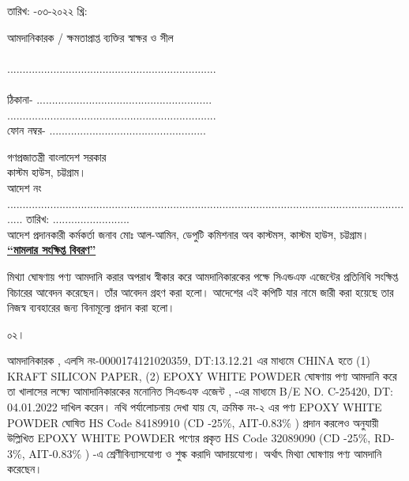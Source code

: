 \documentclass[12pt]{article}
\newcommand{\co}{CHINA}
\newcommand{\beno}{C-25420}
\newcommand{\bedt}{04.01.2022}
\newcommand{\lcno}{0000174121020359}
\newcommand{\lcdt}{13.12.21}
\newcommand{\impn}{\jeal}
\newcommand{\impadd}{\jeala}
\newcommand{\rodt}{\hspace{3em}-০৩-২০২২ খ্রি:}
\begin{document}
\begin{minipage}[t]{0.55\linewidth}
তারিখ: {\rodt}
\end{minipage}
\begin{minipage}[t]{0.45\linewidth}
আমদানিকারক / ক্ষমতাপ্রাপ্ত ব্যক্তির স্বাক্ষর ও সীল
\\
\\
....................................................................
\\
\\
ঠিকানা- .........................................................
\\
....................................................................
\\
ফোন নম্বর-  ...................................................
\end{minipage}
\thispagestyle{empty}
\newpage
{}
\fontsize{10pt}{10pt}\selectfont
\begin{center}
গণপ্রজাতন্ত্রী বাংলাদেশ সরকার
\\
কাস্টম হাউস, চট্টগ্রাম।
\\
আদেশ নং ...................................................................................................................................... তারিখ: .........................
\\
আদেশ প্রদানকারী কর্মকর্তা জনাব মোঃ আল-আমিন, ডেপুটি কমিশনার অব কাস্টমস, কাস্টম হাউস, চট্টগ্রাম।
\\
\textbf{\underline{``মামলার সংক্ষিপ্ত বিবরণ''}}
\\
\end{center}
\begin{minipage}[t]{0.05\linewidth}
\hspace{0em}
\end{minipage}
\begin{minipage}[t]{0.95\linewidth}
মিথ্যা ঘোষণায় পণ্য আমদানি করার অপরাধ স্বীকার করে আমদানিকারকের পক্ষে
সিএন্ডএফ এজেন্টের প্রতিনিধি সংক্ষিপ্ত বিচারের আবেদন করেছেন।
তাঁর আবেদন গ্রহণ করা হলো। আদেশের এই কপিটি যার নামে জারী করা হয়েছে
তার নিজস্ব ব্যবহারের জন্য বিনামূল্যে প্রদান করা হলো।
\\
\end{minipage}
\begin{minipage}[t]{0.05\linewidth}
০২।
\end{minipage}
\begin{minipage}[t]{0.95\linewidth}
আমদানিকারক {\impn}, {\impadd}
এলসি নং-{\lcno}, DT:{\lcdt}
এর মাধ্যমে {\co}
হতে
(1) KRAFT SILICON PAPER,
(2) EPOXY WHITE POWDER
ঘোষণায় পণ্য আমদানি করে তা
খালাসের লক্ষ্যে আমাদানিকারকের
মনোনিত সিএন্ডএফ এজেন্ট
{\cnfn}, {\cnfadd} -এর
মাধ্যমে
B/E NO. {\beno}, DT: {\bedt}
দাখিল করেন।
নথি পর্যালোচনায় দেখা যায় যে,
ক্রমিক নং-২ এর পণ্য
EPOXY WHITE POWDER
ঘোষিত HS Code 84189910
(CD -25\%, AIT-0.83\% )
প্রদান করলেও
{\fsen}
অনুযায়ী উল্লিখিত
EPOXY WHITE POWDER
পণ্যের প্রকৃত HS Code 32089090
(CD -25\%, RD-3\%, AIT-0.83\% ) -এ
শ্রেণীবিন্যাসযোগ্য ও শুল্ক করাদি আদায়যোগ্য।
অর্থাৎ মিথ্যা ঘোষণায় পণ্য আমদানি করেছেন।
\end{minipage}
\end{document}
